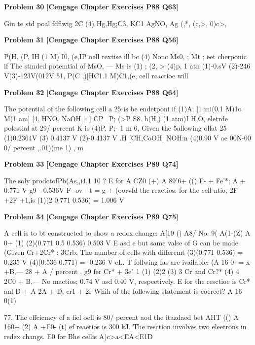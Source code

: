 \begin{problembox}
\textbf{Problem 30} \hfill \textbf{[Cengage Chapter Exercises P88 Q63]}
\label{q:ext-cng-th-30}

Gin te std poal fdflwig 2C
(4) Hg,Hg;C3, KC1 AgNO, Ag
(,*, (c,>, 0)c>,
\end{problembox}

\begin{problembox}
\textbf{Problem 31} \hfill \textbf{[Cengage Chapter Exercises P88 Q56]}
\label{q:ext-cng-th-31}

P(H, (P, IH  (1 M) I0, (e,IP oell rextise ill bc
(4) Nonc
Ms0,  ;
Mt ;
eet
cherponic if
The stmded potemtial of MsO, ---  Ms is
(1) ;
(2, >
(4)p,  1 atn
(1)-0.sV (2)-246 V(3)-123V(012V
51, P(C ,)[HC1.1 M)C1,(e, cell rcactioe will
\end{problembox}

\begin{problembox}
\textbf{Problem 32} \hfill \textbf{[Cengage Chapter Exercises P88 Q64]}
\label{q:ext-cng-th-32}

The potential of the following cell a 25 is
be endetponi if
(1)A;
]1 mi(0.1 M)1o  M(1 am]
[4, HNO, NaOH |: ]
CP ~P;
(>P
S8. h(H,) (1 atm)I H,O, eletrde polestial at 29/ percent  K is
(4)P, P;- 1 m
6, Given the 5allowing ollat 25 
(1)0.2364V
(3) 0.4137 V
(2)-0.4137 V
.H [CH,CoOH| NOH:n
(4)0.90 V
ae 00N-00 0/ percent ,.01)(me 1)
 , m   
\end{problembox}

\begin{problembox}
\textbf{Problem 33} \hfill \textbf{[Cengage Chapter Exercises P89 Q74]}
\label{q:ext-cng-th-33}

The soly prodctofPb(As,,i4.1  10 ? E for
A CZ0 (+) A 89'6+ (()
F-
+ Fe'*;
A +
   0.771 V
g9 - 0.536V
F -ov - t = g + (oorvfd
thc reactios:
  for the cell ntio,
2F +2F  +1,is
(1)(2 0.771  0.536) = 1.006 V
\end{problembox}

\begin{problembox}
\textbf{Problem 34} \hfill \textbf{[Cengage Chapter Exercises P89 Q75]}
\label{q:ext-cng-th-34}

A cell is to bt constructed to show a redox change:
A[19 () A8/ No. 9( A(1-(Z) A 0+ (1)
(2)(0.771  0.5   0.536)  0.503 V
E  asd e but same valse of G  can be made (Given
Cr+2Cr* ;
 3Crb, The number of cells with differemt
(3)(0.771  0.536) = 0.235 V
(4)(0.536  0.771) = -0.236 V
eL. T follwing fas are ivailable:
(A 16 0- =
x +B,--- 28  + A
/ percent , g9 fer Cr* + 3e"
1 (1)
(2)2
(3) 3
  Cr and Cr?*
(4) 4
2C0 + B,--- No mactios;
0.74 V asd 0.40 V, respeetively. E  for the resctioe is
  Cr* anl
D  + A 2A  + D,
cr1 + 2r 
Whih of the follewing statement is coereet?
A 16 0(1)
 
77, The effcicmcy ef a fiel oell is 80/ percent  aod the itazdaed bet
AHT (() A 160+ (2)
A +E0- (t)
ef reaetios is 300 kJ. The resction involves two eleetrons
in redex changs. E0 for Bhe cellis
A)c>a<EA<E1D
\end{problembox}

